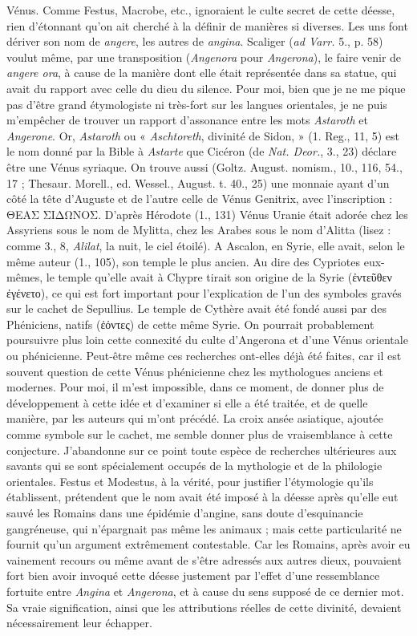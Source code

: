 \documentclass[a4paper, 11pt, oneside, polutonikogreek, french]{article}
\begin{document}
Vénus. Comme Festus, Macrobe, etc., ignoraient le culte secret de cette déesse, rien d'étonnant qu'on ait cherché à la définir de manières si diverses. Les uns font dériver son nom de \emph{angere}, les autres de \emph{angina}. Scaliger (\emph{ad Varr.} 5., p. 58) voulut même, par une transposition (\emph{Angenora} pour \emph{Angerona}), le faire venir de \emph{angere ora}, à cause de la manière dont elle était représentée dans sa statue, qui avait du rapport avec celle du dieu du silence. Pour moi, bien que je ne me pique pas d'être grand étymologiste ni très-fort sur les langues orientales, je ne puis m'empêcher de trouver un rapport d'assonance entre les mots \emph{Astaroth} et \emph{Angerone}. Or, \emph{Astaroth} ou « \emph{Aschtoreth}, divinité de Sidon, » (1. Reg., 11, 5) est le nom donné par la Bible à \emph{Astarte} que Cicéron (de \emph{Nat. Deor.}, 3., 23) déclare être une Vénus syriaque. On trouve aussi (Goltz. August. nomism., 10., 116, 54., 17 ; Thesaur. Morell., ed. Wessel., August. t. 40., 25) une monnaie ayant d'un côté la tête d'Auguste et de l'autre celle de Vénus Genitrix, avec l'inscription : ΘΕΑΣ ΣΙΔΩΝΟΣ. D'après Hérodote (1., 131) Vénus Uranie était adorée chez les Assyriens sous le nom de Mylitta, chez les Arabes sous le nom d'Alitta (lisez : comme 3., 8, \emph{Alilat}, la nuit, le ciel étoilé). A Ascalon, en Syrie, elle avait, selon le même auteur (1., 105), son temple le plus ancien. Au dire des Cypriotes eux-mêmes, le temple qu'elle avait à Chypre tirait son origine de la Syrie (ἐντεῦθεν ἐγένετο), ce qui est fort important pour l'explication de l'un des symboles gravés sur le cachet de Sepullius. Le temple de Cythère avait été fondé aussi par des Phéniciens, natifs (ἐόντες) de cette même Syrie. On pourrait probablement poursuivre plus loin cette connexité du culte d'Angerona et d'une Vénus orientale ou phénicienne. Peut-être même ces recherches ont-elles déjà été faites, car il est souvent question de cette Vénus phénicienne chez les mythologues anciens et modernes. Pour moi, il m'est impossible, dans ce moment, de donner plus de développement à cette idée et d'examiner si elle a été traitée, et de quelle manière, par les auteurs qui m'ont précédé. La croix ansée asiatique, ajoutée comme symbole sur le cachet, me semble donner plus de vraisemblance à cette conjecture. J'abandonne sur ce point toute espèce de recherches ultérieures aux savants qui se sont spécialement occupés de la mythologie et de la philologie orientales. Festus et Modestus, à la vérité, pour justifier l'étymologie qu'ils établissent, prétendent que le nom avait été imposé à la déesse après qu'elle eut sauvé les Romains dans une épidémie d'angine, sans doute d'esquinancie gangréneuse, qui n'épargnait pas même les animaux ; mais cette particularité ne fournit qu'un argument extrêmement contestable. Car les Romains, après avoir eu vainement recours ou même avant de s'être adressés aux autres dieux, pouvaient fort bien avoir invoqué cette déesse justement par l'effet d'une ressemblance fortuite entre \emph{Angina} et \emph{Angerona}, et à cause du sens supposé de ce dernier mot. Sa vraie signification, ainsi que les attributions réelles de cette divinité, devaient nécessairement leur échapper.
\end{document}
